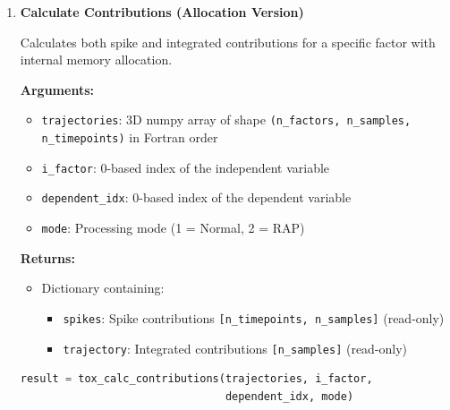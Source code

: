 \documentclass[11pt]{article}
\begin{document}
\begin{enumerate}
\begin{itemize}
	      	\item \texttt{mode}: Processing mode (1 = Normal, 2 = RAP)
	      \end{itemize}
	      \textbf{Returns:}
	      \begin{itemize}
	      	\item \texttt{contribution}: 1D numpy array of shape \texttt{(n\_timepoints,)}
	      	      with contribution values per timepoint (read-only)
	      \end{itemize}
	      \begin{lstlisting}[language=Python, caption={Spike-Wise Contribution Calculation}]
spike_contributions = tox_spike_contribution(factor, dependent, mode)
	      \end{lstlisting}
	      
	\item \textbf{Calculate Contributions (Allocation Version)}
	      
	      Calculates both spike and integrated contributions for a specific factor with
	      internal memory allocation.
	      
	      \textbf{Arguments:}
	      \begin{itemize}
	      	\item \texttt{trajectories}: 3D numpy array of shape \texttt{(n\_factors,
	      	      n\_samples, n\_timepoints)} in Fortran order
	      	
	      	\item \texttt{i\_factor}: 0-based index of the independent variable
	      	      
	      	\item \texttt{dependent\_idx}: 0-based index of the dependent variable
	      	      
	      	\item \texttt{mode}: Processing mode (1 = Normal, 2 = RAP)
	      \end{itemize}
	      \textbf{Returns:}
	      \begin{itemize}
	      	\item Dictionary containing:
	      	      \begin{itemize}
	      	      	\item \texttt{spikes}: Spike contributions \texttt{[n\_timepoints, n\_samples]}
	      	      	      (read-only)
	      	      	      
	      	      	\item \texttt{trajectory}: Integrated contributions \texttt{[n\_samples]}
	      	      	      (read-only)
	      	      \end{itemize}
	      \end{itemize}
	      \begin{lstlisting}[language=Python, caption={Contributions Calculation with Internal Allocation}]
result = tox_calc_contributions(trajectories, i_factor, 
                                dependent_idx, mode)


\end{lstlisting}
\end{enumerate}
\end{document}
